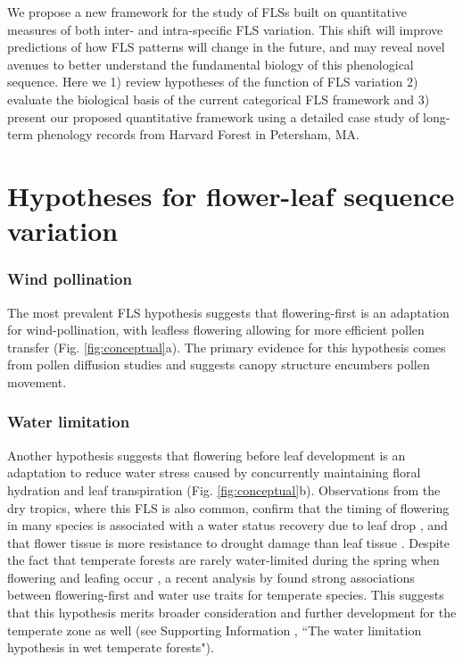 \documentclass[11pt]{article}
\begin{document}
\noindent We propose a new framework for the study of FLSs built on quantitative measures of both inter- and intra-specific FLS variation. This shift will improve predictions of how FLS patterns will change in the future, and  may reveal novel avenues to better understand the fundamental biology of this phenological sequence. Here we 1) review hypotheses of the function of FLS variation 2) evaluate the biological basis of the current categorical FLS framework and 3) present our proposed quantitative framework using a detailed case study of long-term phenology records from Harvard Forest in Petersham, MA.

\section*{Hypotheses for flower-leaf sequence variation}
\subsubsection*{ Wind pollination}
\noindent The most prevalent FLS hypothesis suggests that flowering-first is an adaptation for wind-pollination, with leafless flowering allowing for more efficient pollen transfer \citep{Whitehead1969}(Fig. \ref{fig:conceptual}a). The primary evidence for this hypothesis comes from pollen diffusion studies \citep[e.g., particle movement through closed and open canopies,][]{Niklas1985, Milleron2012} and suggests canopy structure encumbers pollen movement. %
\subsubsection*{Water limitation}
\noindent Another hypothesis suggests that flowering before leaf development is an adaptation to reduce water stress caused by concurrently maintaining floral hydration and leaf transpiration \citep{Franklin2016} (Fig. \ref{fig:conceptual}b). Observations from the dry tropics, where this FLS is also common, confirm that the timing of flowering in many species is associated with a water status recovery due to leaf drop \citep{Borchert1983,Reich1984}, and that flower tissue is more resistance to drought damage than leaf tissue \citep{Zhang2017}. Despite the fact that temperate forests are rarely water-limited during the spring when flowering and leafing occur \citep{Polgar2011}, a recent analysis by \citet{Gougherty2018} found strong associations between flowering-first and water use traits for temperate species. This suggests that this hypothesis merits broader consideration and further development for the temperate zone as well (see Supporting Information , ``The water limitation hypothesis in wet temperate forests"). %
 
\end{document}
